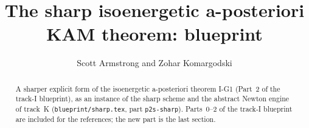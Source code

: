 \documentclass[11pt]{amsart}
\title{The sharp isoenergetic a-posteriori KAM theorem: blueprint}
\author{Scott Armstrong and Zohar Komargodski}
\begin{document}
\begin{abstract}
A sharper explicit form of the isoenergetic a-posteriori theorem I-G1 (Part~2 of the track-I blueprint), as an instance
of the sharp scheme and the abstract Newton engine of track~K (\texttt{blueprint/sharp.tex}, part \texttt{p2s-sharp}).
Parts~0--2 of the track-I blueprint are included for the references; the new part is the last section.
\end{abstract}
\maketitle
\tableofcontents




\end{document}
